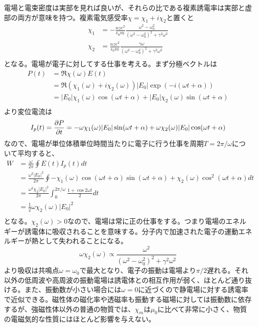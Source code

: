     電場と電束密度は実部を見れば良いが、それらの比である複素誘電率は実部と虚部の両方が意味を持つ。複素電気感受率$\chi = \chi_1 + i\chi_2$と置くと
    \begin{align*}
        \chi_1 &= -\frac{nze^2}{\epsilon_0m}\frac{\omega^2 - \omega_0^2}{(\omega^2 - \omega_0^2)^2 + \gamma^2\omega^2}\\
        \chi_2 &= \frac{nze^2}{\epsilon_0m}\frac{\gamma\omega}{(\omega^2 - \omega_0^2)^2 + \gamma^2\omega^2}\\
    \end{align*}
    となる。電場が電子に対してする仕事を考える。まず分極ベクトルは
    \begin{align*}
        P(t) &= \Re\chi(\omega)E(t)\\
        &= \Re(\chi_1(\omega) + i\chi_2(\omega))|E_0|\exp(-i(\omega t + \alpha))\\
        &= |E_0|\chi_1(\omega)\cos(\omega t + \alpha) + |E_0|\chi_2(\omega)\sin(\omega t + \alpha)\\
    \end{align*}
    より変位電流は
    \begin{align*}
        I_p(t) = \pd[P]{t} = -\omega\chi_1(\omega)|E_0|\sin(\omega t + \alpha) + \omega\chi_2(\omega)|E_0|\cos(\omega t + \alpha)\\
    \end{align*}
    なので、電場が単位体積単位時間当たりに電子に行う仕事を周期$T = 2\pi / \omega$について平均すると、
    \begin{align*}
        W &= \frac{\omega}{2\pi}\oint E(t)I_p(t)dt\\
        &= \frac{\omega^2|E_0|^2}{2\pi}\oint -\chi_1(\omega)\cos(\omega t + \alpha)\sin(\omega t + \alpha) + \chi_2(\omega)\cos^2(\omega t + \alpha) dt\\
        &= \frac{\omega^2\chi_2|E_0|^2}{2\pi}\int_0^{2\pi / \omega} \frac{1 + \cos 2\omega t}{2} dt\\
        &= \frac{1}{2}\omega\chi_2(\omega)|E_0|^2\\
    \end{align*}
    となる。$\chi_2(\omega) > 0$なので、電場は常に正の仕事をする。つまり電場のエネルギーが誘電体に吸収されることを意味する。分子内で加速された電子の運動エネルギーが熱として失われることになる。
        \[\omega\chi_2(\omega) \propto \frac{\omega^2}{(\omega^2 - \omega_0^2)^2 + \gamma^2\omega^2}\]
    より吸収は共鳴点$\omega = \omega_0$で最大となり、電子の振動は電場より$\pi / 2$遅れる。それ以外の低周波や高周波の振動電場は誘電体との相互作用が弱く、ほとんど通り抜ける。また、振動数が小さい場合には$\omega = 0$に近づくので静電場に対する誘電率で近似できる。磁性体の磁化率や透磁率も振動する磁場に対しては振動数に依存するが、強磁性体以外の普通の物質では、$\chi_m$は$\mu_0$に比べて非常に小さく、物質の電磁気的な性質にはほとんど影響を与えない。

